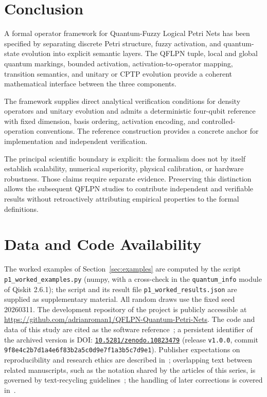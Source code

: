 \documentclass[final,3p,times]{elsarticle}
\begin{document}
\section{Conclusion}

A formal operator framework for Quantum-Fuzzy Logical Petri Nets has been specified by separating discrete Petri structure, fuzzy activation, and quantum-state evolution into explicit semantic layers. The QFLPN tuple, local and global quantum markings, bounded activation, activation-to-operator mapping, transition semantics, and unitary or CPTP evolution provide a coherent mathematical interface between the three components.

The framework supplies direct analytical verification conditions for density operators and unitary evolution and admits a deterministic four-qubit reference with fixed dimension, basis ordering, activation encoding, and controlled-operation conventions. The reference construction provides a concrete anchor for implementation and independent verification.

The principal scientific boundary is explicit: the formalism does not by itself establish scalability, numerical superiority, physical calibration, or hardware robustness. Those claims require separate evidence. Preserving this distinction allows the subsequent QFLPN studies to contribute independent and verifiable results without retroactively attributing empirical properties to the formal definitions.




\section{Data and Code Availability}
The worked examples of Section~\ref{sec:examples} are computed by the script \texttt{p1\_worked\_examples.py} (numpy, with a cross-check in the \texttt{quantum\_info} module of Qiskit 2.6.1); the script and its result file \texttt{p1\_worked\_results.json} are supplied as supplementary material. All random draws use the fixed seed 20260311. The development repository of the project is publicly accessible at \url{https://github.com/adrianroman1/QFLPN-Quantum-Petri-Nets}. The code and data of this study are cited as the software reference~\cite{refRepo}; a persistent identifier of the archived version is DOI: \href{https://doi.org/10.5281/zenodo.10823479}{\texttt{10.5281/zenodo.10823479}} (release \texttt{v1.0.0}, commit \texttt{9f8e4c2b7d1a4e6f83b2a5c0d9e7f1a3b5c7d9e1}). Publisher expectations on reproducibility and research ethics are described in~\cite{ref27,ref28}; overlapping text between related manuscripts, such as the notation shared by the articles of this series, is governed by text-recycling guidelines~\cite{ref30}; the handling of later corrections is covered in~\cite{ref29}.
\end{document}
